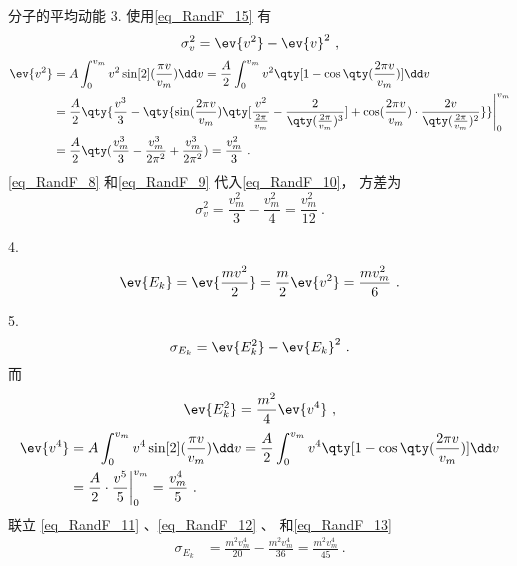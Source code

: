 \begin{example}{分子的平均动能}
3. 使用\autoref{eq_RandF_15} 有
\begin{equation}\label{eq_RandF_10}
\sigma_v^2=\ev{v^2}-\ev{v}^2~,
\end{equation}
\begin{equation}\label{eq_RandF_9}
\begin{aligned}
\ev{v^2}&=A\int_{0}^{v_{m}} v^2\sin[2](\frac{\pi v}{v_{m}})\dd v=\frac{A}{2}\int_{0}^{v_{m}}v^2\qty[1-\cos\qty(\frac{2\pi v}{v_{m}})]\dd v\\
&=\frac{A}{2}\qty{\frac{v^3}{3}-\qty{\sin(\frac{2\pi v}{v_{m}})\qty[\frac{v^2}{\frac{2\pi }{v_{m}}}-\frac{2}{\qty(\frac{2\pi }{v_{m}})^3}]+\cos(\frac{2\pi v}{v_{m}})\cdot\frac{2v}{\qty(\frac{2\pi}{v_{m}})^2}}}\Bigg|_0^{v_{m}}\\
&=\frac{A}{2}\qty(\frac{v_m^3}{3}-\frac{v_{m}^3}{2\pi^2}+\frac{v_{m}^3}{2\pi^2})=\frac{v_{m}^2}{3}~.
\end{aligned}
\end{equation}
\autoref{eq_RandF_8} 和\autoref{eq_RandF_9} 代入\autoref{eq_RandF_10}， 方差为
\begin{equation}
\sigma_v^2=\frac{v_{m}^2}{3}-\frac{v_{m}^2}{4}=\frac{v_m^2}{12}~.
\end{equation}

4.
\begin{equation}\label{eq_RandF_11}
\ev{E_k}=\ev{\frac{mv^2}{2}}=\frac{m}{2}\ev{v^2}=\frac{mv_{m}^2}{6}~.
\end{equation}

5.
\begin{equation}\label{eq_RandF_12}
\sigma_{E_k}=\ev{E_k^2}-\ev{E_k}^2~.
\end{equation}
而
\begin{equation}\label{eq_RandF_13}
\ev{E_k^2}=\frac{m^2}{4}\ev{v^4}~,
\end{equation}
\begin{equation}
\begin{aligned}
\ev{v^4}&=A\int_0^{v_{m}}v^4\sin[2](\frac{\pi v}{v_{m}})\dd v =\frac{A}{2}\int_0^{v_{m}}v^4\qty[1-\cos\qty(\frac{2\pi v}{v_{m}})]\dd v\\
&=\frac{A}{2}\cdot\frac{v^5}{5}\bigg|_0^{v_{m}}=\frac{v_m^4}{5}~.
\end{aligned}
\end{equation}
联立 \autoref{eq_RandF_11}  、\autoref{eq_RandF_12} 、 和\autoref{eq_RandF_13} 
\begin{equation}
\begin{aligned}
\sigma_{E_k}&=\frac{m^2v_m^4}{20}-\frac{m^2v_m^4}{36}=\frac{m^2v_m^4}{45}~.
\end{aligned}
\end{equation}
\end{example}

